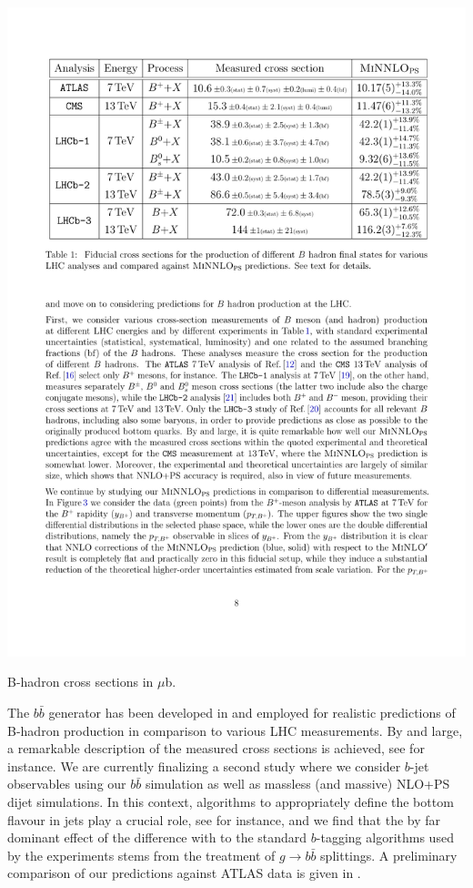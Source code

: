 \documentclass{FBR_Bericht_2025}
\begin{document}
\begin{refsection}
\begin{table}[b!]
\begin{center}
\includegraphics[width=1\linewidth]{plots/bb_table.pdf}
\caption{B-hadron cross sections in $\mu$b.}
\label{tab:bb}
\end{center}
\end{table}

The $b\bar b$ \minnlo{}  generator has been developed in  and employed for 
realistic predictions of B-hadron production in comparison to various LHC measurements.
By and large, a remarkable description of the measured cross sections is achieved, 
see  for instance. We are currently finalizing a second study where we 
consider $b$-jet observables using our $b\bar b$ \minnlo{} simulation as
well as massless (and massive) NLO+PS dijet simulations. In this context, 
algorithms to appropriately define the bottom flavour in jets play a crucial role, see
 for instance, and we find that the by far dominant effect 
of the difference with to the standard $b$-tagging algorithms used by the experiments
stems from the treatment of $g\to b\bar b$ splittings.
A preliminary comparison of our \minnlo{} predictions against ATLAS data is given in 
.


\end{refsection}
\end{document}
